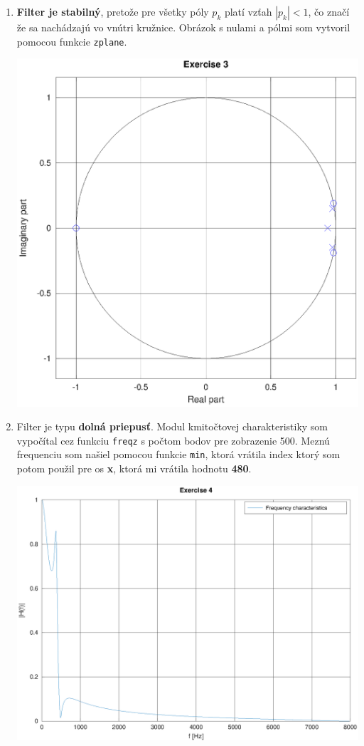 \documentclass[11pt, a4paper,twocolumn]{article}
\begin{document}
\begin{enumerate}
    \item
    {
        \textbf{Filter je stabilný}, pretože pre všetky póly \texttt{$p_k$} platí vzťah \texttt{$|p_k| < 1$}, čo značí že sa nachádzajú vo vnútri kružnice. Obrázok s nulami a pólmi som vytvoril pomocou funkcie \texttt{zplane}.
        \begin{center}
        \includegraphics[width=\linewidth,keepaspectratio]{include/3.eps}
        \end{center}
    }

    \item
    {
        Filter je typu \textbf{dolná priepusť}. Modul kmitočtovej charakteristiky som vypočítal cez funkciu \texttt{freqz} s počtom bodov pre zobrazenie 500. Meznú frequenciu som našiel pomocou funkcie \texttt{min}, ktorá vrátila index ktorý som potom použil pre os \textbf{x}, ktorá mi vrátila hodnotu \textbf{480}.
        \begin{center}
        \includegraphics[width=\linewidth,keepaspectratio]{include/4.eps}
        \end{center}
    }


\end{enumerate}
\end{document}
